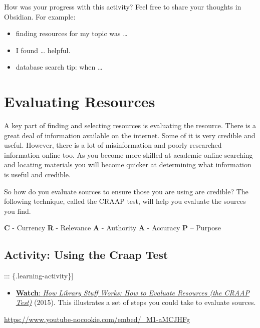 \documentclass[
  letterpaper,
  DIV=11,
  numbers=noendperiod]{scrreprt}
\providecommand{\tightlist}{%
  \setlength{\itemsep}{0pt}\setlength{\parskip}{0pt}}\usepackage{longtable,booktabs,array}
\begin{document}
\begin{tcolorbox}
\begin{tcolorbox}
How was your progress with this activity? Feel free to share your
thoughts in Obsidian. For example:

\begin{itemize}
\tightlist
\item
  finding resources for my topic was \ldots{}
\item
  I found \ldots{} helpful.
\item
  database search tip: when \ldots{}
\end{itemize}

\end{tcolorbox}

\section{Evaluating Resources}\label{evaluating-resources}

A key part of finding and selecting resources is evaluating the
resource. There is a great deal of information available on the
internet. Some of it is very credible and useful. However, there is a
lot of misinformation and poorly researched information online too. As
you become more skilled at academic online searching and locating
materials you will become quicker at determining what information is
useful and credible.

So how do you evaluate sources to ensure those you are using are
credible? The following technique, called the CRAAP test, will help you
evaluate the sources you find.

\textbf{C} - Currency \textbf{R} - Relevance \textbf{A} - Authority
\textbf{A} - Accuracy \textbf{P} -- Purpose

\subsection{Activity: Using the Craap
Test}\label{activity-using-the-craap-test}

::: \{.learning-activity\}{]}

\begin{itemize}
\tightlist
\item
  \href{https://www.youtube.com/watch?v=_M1-aMCJHFg}{\textbf{Watch}:
  \emph{How Library Stuff Works: How to Evaluate Resources (the CRAAP
  Test)}} (2015). This illustrates a set of steps you could take to
  evaluate sources.
\end{itemize}

\url{https://www.youtube-nocookie.com/embed/_M1-aMCJHFg}


\end{tcolorbox}
\end{document}
